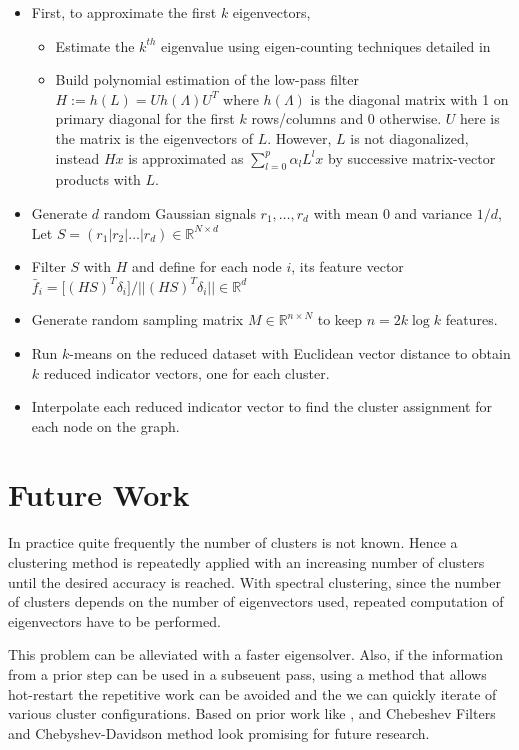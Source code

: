 \documentclass[10pt,a4paper, nocenter]{report}
\newcommand{\norm}[1]{\lvert\lvert {#1} \rvert\rvert}
\begin{document}
    \begin{itemize}
        \item First, to approximate the first $k$ eigenvectors,  
            \begin{itemize}
            \item Estimate the $k^{th}$ eigenvalue using eigen-counting techniques detailed in \cite{Di13efficientestimation} 
            \item Build polynomial estimation of the low-pass filter $H := h(L) = U h(\Lambda) U^T$ where $h({\Lambda})$ is the diagonal matrix with 1 on primary diagonal for the first $k$ rows/columns and 0 otherwise. $U$ here is the matrix is the eigenvectors of $L$. However, $L$ is not diagonalized, instead $Hx$ is approximated as $\sum_{l=0}^{p}\alpha_l L^{l}x$ by successive matrix-vector products with $L$.
            \end{itemize}
        \item  Generate $d$ random Gaussian signals $r_1,\dots, r_d$ with mean $0$ and variance $1/d$, Let $S = (r_1|r_2|\dots|r_d) \in \mathbb{R}^{N\times d}$
        \item Filter $S$ with $H$ and define for each node $i$, its feature vector $\bar{f}_i = \big[ (HS)^T \delta_i \big] / \norm{(HS)^T \delta_i} \in \mathbb{R}^d$
        \item Generate random sampling matrix $M\in \mathbb{R}^{n\times N}$ to keep $n=2k \log{k}$ features. 
        \item Run $k$-means on the reduced dataset with Euclidean vector distance to obtain $k$ reduced indicator vectors, one for each cluster. 
        \item Interpolate each reduced indicator vector to find the cluster assignment for each node on the graph.
    \end{itemize}

    \chapter{Future Work}
    In practice quite frequently the number of clusters is not known. Hence a clustering method is repeatedly applied with an increasing number of clusters until the desired accuracy is reached. With spectral clustering, since the number of clusters depends on the number of eigenvectors used, repeated computation of eigenvectors have to be performed.

    This problem can be alleviated with a faster eigensolver. Also, if the information from a prior step can be used in a subseuent pass, using a method that allows hot-restart the repetitive work can be avoided and the we can quickly iterate of various cluster configurations. Based on prior work like \cite{chebydav07}, \cite{bchebydav10} and \cite{zhengwang:15} Chebeshev Filters and Chebyshev-Davidson method look promising for future research. 
\end{document}
